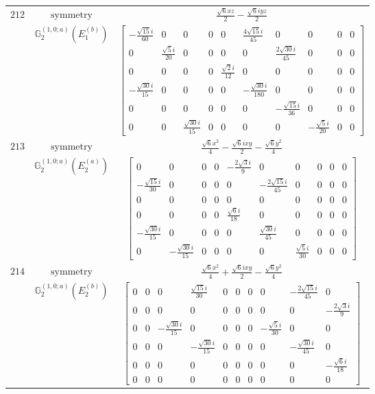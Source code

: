 \documentclass[fleqn,8pt,landscape]{jsarticle}
\begin{document}
\begin{longtable}{ccc}
$ 212 $ & $ \text{symmetry} $ & $ \frac{\sqrt{6} x z}{2} - \frac{\sqrt{6} i y z}{2} $ \\
$  $ & $ \mathbb{G}_{2}^{(1,0;a)}(E_{1}^{(b)}) $ & $ \begin{bmatrix} - \frac{\sqrt{15} i}{60} & 0 & 0 & 0 & 0 & \frac{4 \sqrt{15} i}{45} & 0 & 0 & 0 & 0 \\ 0 & \frac{\sqrt{5} i}{20} & 0 & 0 & 0 & 0 & \frac{2 \sqrt{30} i}{45} & 0 & 0 & 0 \\ 0 & 0 & 0 & 0 & \frac{\sqrt{2} i}{12} & 0 & 0 & 0 & 0 & 0 \\ - \frac{\sqrt{30} i}{15} & 0 & 0 & 0 & 0 & - \frac{\sqrt{30} i}{180} & 0 & 0 & 0 & 0 \\ 0 & 0 & 0 & 0 & 0 & 0 & - \frac{\sqrt{15} i}{36} & 0 & 0 & 0 \\ 0 & 0 & \frac{\sqrt{30} i}{15} & 0 & 0 & 0 & 0 & - \frac{\sqrt{5} i}{20} & 0 & 0 \end{bmatrix} $ \\ \hline
$ 213 $ & $ \text{symmetry} $ & $ \frac{\sqrt{6} x^{2}}{4} - \frac{\sqrt{6} i x y}{2} - \frac{\sqrt{6} y^{2}}{4} $ \\
$  $ & $ \mathbb{G}_{2}^{(1,0;a)}(E_{2}^{(a)}) $ & $ \begin{bmatrix} 0 & 0 & 0 & 0 & - \frac{2 \sqrt{3} i}{9} & 0 & 0 & 0 & 0 & 0 \\ - \frac{\sqrt{15} i}{30} & 0 & 0 & 0 & 0 & - \frac{2 \sqrt{15} i}{45} & 0 & 0 & 0 & 0 \\ 0 & 0 & 0 & 0 & 0 & 0 & 0 & 0 & 0 & 0 \\ 0 & 0 & 0 & 0 & \frac{\sqrt{6} i}{18} & 0 & 0 & 0 & 0 & 0 \\ - \frac{\sqrt{30} i}{15} & 0 & 0 & 0 & 0 & \frac{\sqrt{30} i}{45} & 0 & 0 & 0 & 0 \\ 0 & - \frac{\sqrt{30} i}{15} & 0 & 0 & 0 & 0 & \frac{\sqrt{5} i}{30} & 0 & 0 & 0 \end{bmatrix} $ \\ \hline
$ 214 $ & $ \text{symmetry} $ & $ \frac{\sqrt{6} x^{2}}{4} + \frac{\sqrt{6} i x y}{2} - \frac{\sqrt{6} y^{2}}{4} $ \\
$  $ & $ \mathbb{G}_{2}^{(1,0;a)}(E_{2}^{(b)}) $ & $ \begin{bmatrix} 0 & 0 & 0 & \frac{\sqrt{15} i}{30} & 0 & 0 & 0 & 0 & - \frac{2 \sqrt{15} i}{45} & 0 \\ 0 & 0 & 0 & 0 & 0 & 0 & 0 & 0 & 0 & - \frac{2 \sqrt{3} i}{9} \\ 0 & 0 & - \frac{\sqrt{30} i}{15} & 0 & 0 & 0 & 0 & - \frac{\sqrt{5} i}{30} & 0 & 0 \\ 0 & 0 & 0 & - \frac{\sqrt{30} i}{15} & 0 & 0 & 0 & 0 & - \frac{\sqrt{30} i}{45} & 0 \\ 0 & 0 & 0 & 0 & 0 & 0 & 0 & 0 & 0 & - \frac{\sqrt{6} i}{18} \\ 0 & 0 & 0 & 0 & 0 & 0 & 0 & 0 & 0 & 0 \end{bmatrix} $ \\ \hline

\end{longtable}
\end{document}
